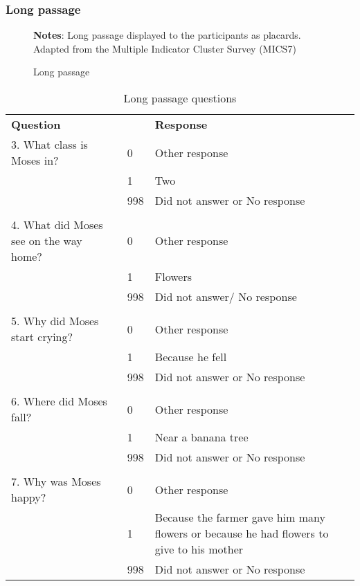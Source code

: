 \documentclass[hidelinks,12pt]{article}
\begin{document}
\subsubsection{Long passage}
\begin{figure}[H]
\centering
\caption{Long passage}\label{fig:lit_passage_l}
\footnotesize{\justify\textbf{Notes}: Long passage displayed to the participants as placards. Adapted from the Multiple Indicator Cluster Survey (MICS7)}
\end{figure}
\vspace{-12.5mm}
\begin{table}[H]
\begin{singlespace}
    \centering
    \fontsize{10pt}{9pt}\selectfont  %
    \caption{Long passage questions} \label{passage_l_questions}
    \begin{tabular}{@{}p{}p{}p{}@{}}
    \textbf{Question} & & \textbf{Response}\\
3. What class is Moses in?	& 0	& Other response \\
	& 1	& Two \\
	& 998	& Did not answer or No response \\
    & & \\
4. What did Moses see on the way home?	& 0	& Other response \\
	& 1	& Flowers \\
	& 998 & Did not answer/ No response \\
    & & \\
5. Why did Moses start crying?	& 0	& Other response \\
	& 1	& Because he fell \\
	& 998	& Did not answer or No response \\
    & & \\
6. Where did Moses fall?	& 0	& Other response \\
	& 1	& Near a banana tree \\
	& 998	& Did not answer or No response \\
    & & \\
7. Why was Moses happy?	& 0	& Other response \\
	& 1	& Because the farmer gave him many flowers or because he had flowers to give to his mother \\
	& 998	& Did not answer or No response \\
    \end{tabular}
\end{singlespace}
\end{table}
\end{document}
